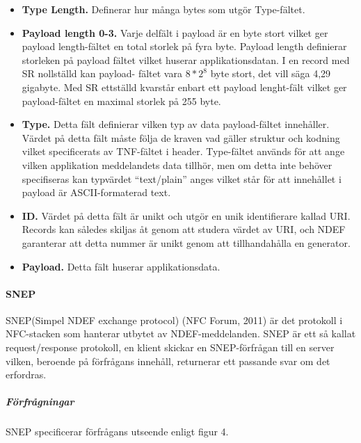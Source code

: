 \documentclass[11pt]{article}
\begin{document}
\begin{itemize}
\item \textbf{Type Length.} Definerar hur många bytes som utgör Type-fältet.
\item \textbf{Payload length 0-3.} Varje delfält i payload är en byte stort vilket ger payload length-fältet en total storlek på fyra byte. Payload length definierar storleken på payload fältet vilket huserar applikationsdatan. I en record med SR nollställd kan payload- fältet vara $8*2^8$ byte stort, det vill säga 4,29 gigabyte. Med SR ettställd kvarstår enbart ett payload lenght-fält vilket ger payload-fältet en maximal storlek på 255 byte.
\item \textbf{Type.} Detta fält definierar vilken typ av data payload-fältet innehåller. Värdet på detta fält måste följa de kraven vad gäller struktur och kodning vilket specificerats av TNF-fältet i header. Type-fältet används för att ange vilken applikation meddelandets data tillhör, men om detta inte behöver specifiseras kan typvärdet “text/plain” anges vilket står för att innehållet i payload är ASCII-formaterad text.
\item \textbf{ID.} Värdet på detta fält är unikt och utgör en unik identifierare kallad URI. Records kan således skiljas åt genom att studera värdet av URI, och NDEF garanterar att detta nummer är unikt genom att tillhandahålla en generator.
\item \textbf{Payload.} Detta fält huserar applikationsdata.
\end{itemize}


\paragraph{SNEP} 
SNEP(Simpel NDEF exchange protocol) (NFC Forum, 2011) är det protokoll i NFC-stacken som hanterar utbytet av NDEF-meddelanden. SNEP är ett så kallat request/response protokoll, en klient skickar en SNEP-förfrågan till en server vilken, beroende på förfrågans innehåll, returnerar ett passande svar om det erfordras.

\subparagraph{Förfrågningar}
SNEP specificerar förfrågans utseende enligt figur 4.

\end{document}
